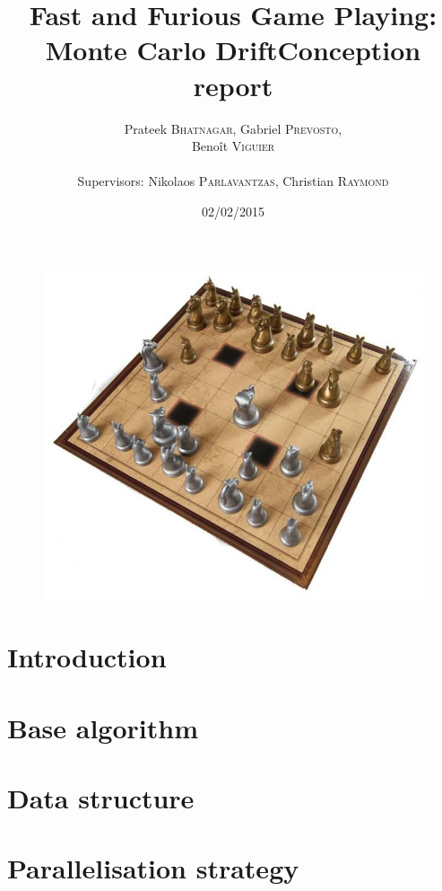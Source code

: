 \documentclass[12pt]{article}
\title{Fast and Furious Game Playing: Monte Carlo Drift\smallbreak Conception report} %
\author{Prateek \textsc{Bhatnagar}, Gabriel \textsc{Prevosto}, \\
        Benoît \textsc{Viguier} \\
        \\
        Supervisors: Nikolaos \textsc{Parlavantzas}, Christian \textsc{Raymond}}
\date{02/02/2015}
\begin{document}
\maketitle

\begin{figure}[!h] 
\centerline{\includegraphics[scale=0.50]{Pictures/arimaa}}
\end{figure}
\newpage

\tableofcontents
\newpage


\section{Introduction}					\label{sec:introduction} 		

\newpage
\section{Base algorithm}				\label{sec:Algo}				

\newpage
\section{Data structure}				\label{sec:data}				

\newpage
\section{Parallelisation strategy}		\label{sec:paralstrat}			
\end{document}
